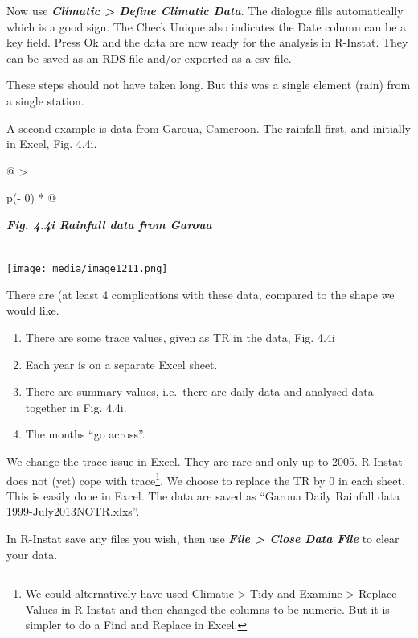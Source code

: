 \documentclass[
  letterpaper,
  DIV=11,
  numbers=noendperiod]{scrreprt}
\begin{document}
Now use \textbf{\emph{Climatic \textgreater{} Define Climatic Data}}.
The dialogue fills automatically which is a good sign. The Check Unique
also indicates the Date column can be a key field. Press Ok and the data
are now ready for the analysis in R-Instat. They can be saved as an RDS
file and/or exported as a csv file.

These steps should not have taken long. But this was a single element
(rain) from a single station.

A second example is data from Garoua, Cameroon. The rainfall first, and
initially in Excel, Fig. 4.4i.

\begin{longtable}[]{@{}
  >{\raggedright\arraybackslash}p{(\columnwidth - 0\tabcolsep) * }@{}}
\toprule\noalign{}
\begin{minipage}[b]{\linewidth}\raggedright
\textbf{\emph{Fig. 4.4i Rainfall data from Garoua}}
\end{minipage} \\
\midrule\noalign{}
\endhead
\bottomrule\noalign{}
\endlastfoot
\texttt{[image: media/image1211.png]} \\
\end{longtable}

There are (at least 4 complications with these data, compared to the
shape we would like.

\begin{enumerate}
\def\labelenumi{\arabic{enumi}.}
\item
  There are some trace values, given as TR in the data, Fig. 4.4i
\item
  Each year is on a separate Excel sheet.
\item
  There are summary values, i.e.~there are daily data and analysed data
  together in Fig. 4.4i.
\item
  The months ``go across''.
\end{enumerate}

We change the trace issue in Excel. They are rare and only up to 2005.
R-Instat does not (yet) cope with trace\footnote{We could alternatively
  have used Climatic \textgreater{} Tidy and Examine \textgreater{}
  Replace Values in R-Instat and then changed the columns to be numeric.
  But it is simpler to do a Find and Replace in Excel.}. We choose to
replace the TR by 0 in each sheet. This is easily done in Excel. The
data are saved as ``Garoua Daily Rainfall data 1999-July2013NOTR.xlxs''.

In R-Instat save any files you wish, then use \textbf{\emph{File
\textgreater{} Close Data File}} to clear your data.
\end{document}
